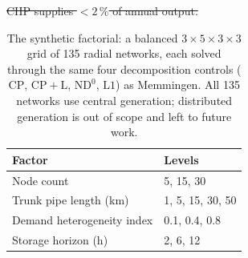 \documentclass[a4paper,fleqn]{cas-sc} %
\newcommand{\CP}{\ensuremath{\mathrm{CP}}}      %
\newcommand{\CPL}{\ensuremath{\mathrm{CP{+}L}}} %
\newcommand{\NDz}{\ensuremath{\mathrm{ND^{0}}}} %
\newcommand{\Lone}{\ensuremath{\mathrm{L1}}}    %
\providecommand{\DIFdel}[1]{{\protect\color{red}\sout{#1}}} %
\providecommand{\DIFdelFL}[1]{\DIFdel{#1}} %
\providecommand{\DIFaddbeginFL}{} %
\providecommand{\DIFaddendFL}{} %
\providecommand{\DIFdelendFL}{} %
\begin{document}
{\begin{table}[t]
\DIFdelFL{CHP supplies ${<}2\,\%$ of annual output. }%
\DIFdelendFL \DIFaddbeginFL \caption{The synthetic factorial: a balanced $3\times5\times3\times3$ grid of 135 radial
networks, each solved through the same four decomposition controls
($\CP$, $\CPL$, $\NDz$, $\Lone$) as Memmingen. All 135 networks use central generation;
distributed generation is out of scope and left to future work.}
\label{tab:synthetic}
\begin{tabular}{ll}
\hline
Factor & Levels \\
\hline
Node count & 5, 15, 30 \\
Trunk pipe length (km) & 1, 5, 15, 30, 50 \\
Demand heterogeneity index & 0.1, 0.4, 0.8 \\
Storage horizon (h) & 2, 6, 12 \\
\hline
\end{tabular}
\DIFaddendFL \end{table}


}
\end{document}
